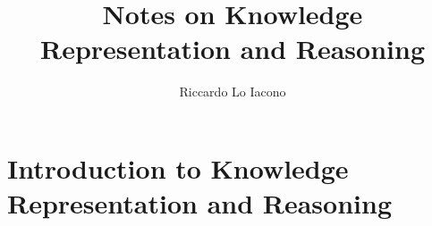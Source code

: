 \documentclass[moon]{lectures2}
\title{Notes on Knowledge Representation and Reasoning}
\author{Riccardo Lo Iacono}
\begin{document}
    \maketitle

    \section[Introduction to KRR]{Introduction to Knowledge Representation and Reasoning} 
    
    \printbibliography
    \printglossaries
\end{document}
